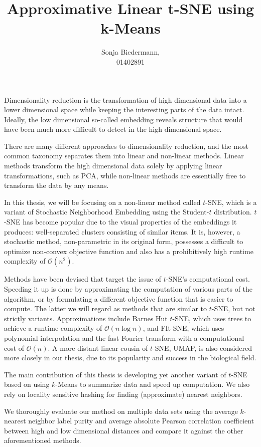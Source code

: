 \documentclass[nenglish]{scrartcl}
\begin{document}
\title{Approximative Linear t-SNE using k-Means}

\author{Sonja Biedermann,\\01402891}

\maketitle

Dimensionality reduction is the transformation of high dimensional
data into a lower dimensional space while keeping the interesting parts
of the data intact. Ideally, the low dimensional so-called embedding
reveals structure that would have been much more difficult to detect
in the high dimensional space.

There are many different approaches to dimensionality reduction, and the most
common taxonomy separates them into linear and non-linear methods. Linear
methods transform the high dimensional data solely by applying linear
transformations, such as PCA, while non-linear methods are essentially
free to transform the data by any means.

In this thesis, we will be focusing on a non-linear method called $t$-SNE,
which is a variant of Stochastic Neighborhood Embedding using the Student-$t$
distribution. $t$-SNE has become popular due to the visual properties of the
embeddings it produces: well-separated clusters consisting of similar items.
It is, however, a stochastic method, non-parametric in its original form, possesses
a difficult to optimize non-convex objective function and also has a prohibitively
high runtime complexity of $\mathcal{O}(n^2)$.

Methods have been devised that target the issue of $t$-SNE's
computational cost. Speeding it up is done by approximating the computation of
various parts of the algorithm, or by formulating a different objective
function that is easier to compute. The latter we will regard as methods that
are similar to $t$-SNE, but not strictly variants. Approximations include
Barnes Hut $t$-SNE, which uses trees to achieve a runtime complexity of
$\mathcal{O}(n \log n)$, and FIt-SNE, which uses polynomial interpolation and
the fast Fourier transform with a computational cost of $\mathcal{O}(n)$. A
more distant linear cousin of $t$-SNE, UMAP, is also considered more closely in our
thesis, due to its popularity and success in the biological field.

The main contribution of this thesis is developing yet another variant of $t$-SNE
based on using $k$-Means to summarize data and speed up computation. We also rely
on locality sensitive hashing for finding (approximate) nearest neighbors.

We thoroughly evaluate our method on multiple data sets using the average
$k$-nearest neighbor label purity and average absolute Pearson correlation
coefficient between high and low dimensional distances and compare it against
the other aforementioned methods.
\end{document}
